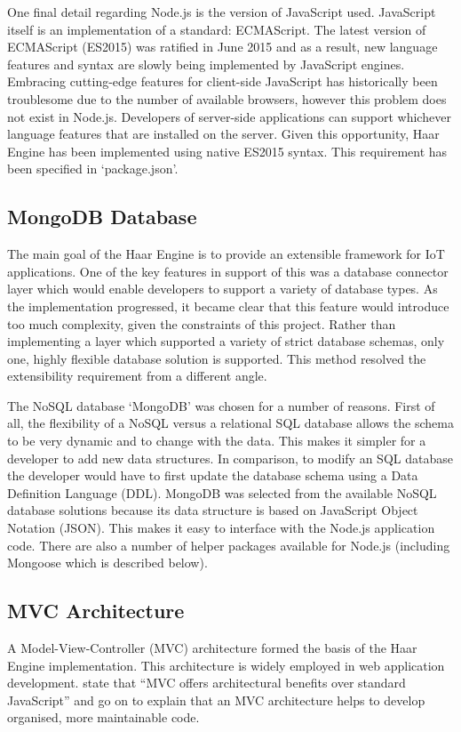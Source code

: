       One final detail regarding Node.js is the version of JavaScript used. JavaScript itself is an implementation of a standard: ECMAScript. The latest version of ECMAScript (ES2015) was ratified in June 2015 \citep{es2015} and as a result, new language features and syntax are slowly being implemented by JavaScript engines. Embracing cutting-edge features for client-side JavaScript has historically been troublesome due to the number of available browsers, however this problem does not exist in Node.js. Developers of server-side applications can support whichever language features that are installed on the server. Given this opportunity, Haar Engine has been implemented using native ES2015 syntax. This requirement has been specified in `package.json'.

    \subsection{MongoDB Database}
      The main goal of the Haar Engine is to provide an extensible framework for IoT applications. One of the key features in support of this was a database connector layer which would enable developers to support a variety of database types. As the implementation progressed, it became clear that this feature would introduce too much complexity, given the constraints of this project. Rather than implementing a layer which supported a variety of strict database schemas, only one, highly flexible database solution is supported. This method resolved the extensibility requirement from a different angle.

      The NoSQL database `MongoDB' was chosen for a number of reasons. First of all, the flexibility of a NoSQL versus a relational SQL database allows the schema to be very dynamic and to change with the data. This makes it simpler for a developer to add new data structures. In comparison, to modify an SQL database the developer would have to first update the database schema using a Data Definition Language (DDL). MongoDB was selected from the available NoSQL database solutions because its data structure is based on JavaScript Object Notation (JSON). This makes it easy to interface with the Node.js application code. There are also a number of helper packages available for Node.js (including Mongoose which is described below).

    \subsection{MVC Architecture}
      A Model-View-Controller (MVC) architecture formed the basis of the Haar Engine implementation. This architecture is widely employed in web application development. \citet{google-mvc} state that ``MVC offers architectural benefits over standard JavaScript'' and go on to explain that an MVC architecture helps to develop organised, more maintainable code.

